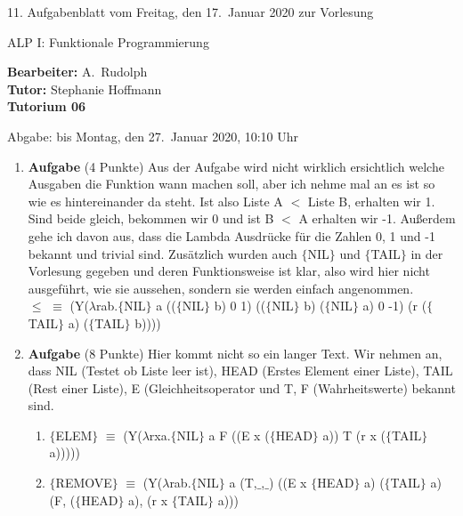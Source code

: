\documentclass[11pt]{article}
\newcommand{\VORLESUNG}{ALP I: Funktionale Programmierung}
\newcommand{\STAFF}{A.\ Rudolph}
\newcommand{\ASSIGNMENT}{11}
\newcommand{\HANDOUT}{Freitag, den 17.\ Januar   2020}
\newcommand{\TUTOR}{Stephanie Hoffmann}
\newcommand{\DELIVER}{bis Montag, den 27.\ Januar 2020, 10:10 Uhr}
\newcommand{\punkte}[1]{{\small{ }(#1 Punkte)}}
\newcommand{\aufgabe}[1]{\item{\bf #1}}
\begin{document}
\begin{center}
\ASSIGNMENT{}. Aufgabenblatt vom \HANDOUT{} zur Vorlesung 
\vspace*{0.5cm}

{\Large \VORLESUNG{}}

\textbf{Bearbeiter:} \STAFF{}\\
\textbf{Tutor:} \TUTOR\\
\textbf{Tutorium 06}
\vspace*{0.5cm}

{\small Abgabe: \DELIVER{}}
\vspace*{1cm}
\end{center}

\begin{enumerate}
\aufgabe{Aufgabe}\punkte{4}
Aus der Aufgabe wird nicht wirklich ersichtlich welche Ausgaben die Funktion wann machen soll, aber ich nehme mal an es ist so wie es hintereinander da steht. Ist also Liste A $<$ Liste B, erhalten wir 1. Sind beide gleich, bekommen wir 0 und ist B $<$ A erhalten wir -1. Außerdem gehe ich davon aus, dass die Lambda Ausdrücke für die Zahlen 0, 1 und -1 bekannt und trivial sind. Zusätzlich wurden auch $\lbrace$NIL$\rbrace$ und $\lbrace$TAIL$\rbrace$ in der Vorlesung gegeben und deren Funktionsweise ist klar, also wird hier nicht ausgeführt, wie sie aussehen, sondern sie werden einfach angenommen.\\
\newline
$\leq$ $\equiv$ (Y($\lambda$rab.$\lbrace$NIL$\rbrace$ a (($\lbrace$NIL$\rbrace$ b) 0 1) (($\lbrace$NIL$\rbrace$ b) ($\lbrace$NIL$\rbrace$ a) 0 -1) (r ($\lbrace$TAIL$\rbrace$ a) ($\lbrace$TAIL$\rbrace$ b))))

\aufgabe{Aufgabe}\punkte{8}
Hier kommt nicht so ein langer Text. Wir nehmen an, dass NIL (Testet ob Liste leer ist), HEAD (Erstes Element einer Liste), TAIL (Rest einer Liste), E (Gleichheitsoperator und T, F (Wahrheitswerte) bekannt sind.
\begin{enumerate}
\item $\lbrace$ELEM$\rbrace$ $\equiv$ (Y($\lambda$rxa.$\lbrace$NIL$\rbrace$ a F ((E x ($\lbrace$HEAD$\rbrace$ a)) T (r x ($\lbrace$TAIL$\rbrace$ a)))))

\item $\lbrace$REMOVE$\rbrace$ $\equiv$ (Y($\lambda$rab.$\lbrace$NIL$\rbrace$ a (T,$\_$,$\_$) ((E x $\lbrace$HEAD$\rbrace$ a) ($\lbrace$TAIL$\rbrace$ a) (F, ($\lbrace$HEAD$\rbrace$ a), (r x $\lbrace$TAIL$\rbrace$ a)))
\end{enumerate}


\end{enumerate}
\end{document}
